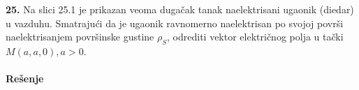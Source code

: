 \textbf{\Large 25.} Na slici 25.1 je prikazan veoma duga\v{c}ak tanak naelektrisani ugaonik (diedar) u vazduhu. Smatraju\'{c}i da je ugaonik ravnomerno naelektrisan po svojoj povr\v{s}i naelektrisanjem povr\v{s}inske gustine $\rho_S$, odrediti vektor elektri\v{c}nog polja u ta\v{c}ki $M(a,a,0), a>0$.
\\\\
\textbf{\Large Re\v{s}enje}\\
